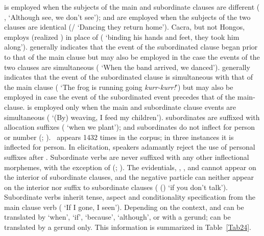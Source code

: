  is employed when the subjects of the main and subordinate clauses are different ( ,   `Although  see, we don't see');  and  are employed when the subjects of the two clauses are identical (/   `Dancing they return home'). Cacra, but not Hongos, employs  (realized \textipa{[l]}) in place of  (  `binding his hands and feet, they took him along').  generally indicates that the event of the subordinated clause began prior to that of the main clause but may also be employed in the case the events of the two clauses are simultaneous (   `When the band arrived, we danced').  generally indicates that the event of the subordinated clause is simultaneous with that of the main clause (   `The frog is running going \emph{kurr-kurr!}') but may also be employed in case the event of the subordinated event precedes that of the main-clause.  is employed only when the main and subordinate clause events are simultaneous (   `(By) weaving, I feed my children').  subordinates are suffixed with allocation suffixes ( `when we plant');  and  subordinates do not inflect for person or number (; ).\
{ appears 1432 times in the corpus; in three instances it is inflected for person. In elicitation, speakers adamantly reject the use of personal suffixes after .} Subordinate verbs are never suffixed with any other inflectional morphemes, with the exception of  (; ). The evidentials, , , and  cannot appear on the interior of subordinate clauses, and the negative particle  can neither appear on the interior nor suffix to subordinate clauses ( () `if you don't talk'). Subordinate verbs inherit tense, aspect and conditionality specification from the main clause verb (   `If I  gone, I  seen'). Depending on the context,  and  can be translated by `when', `if', `because', `although', or with a gerund;  can be translated by a gerund only. This information is summarized in Table~\ref{Tab24}.

